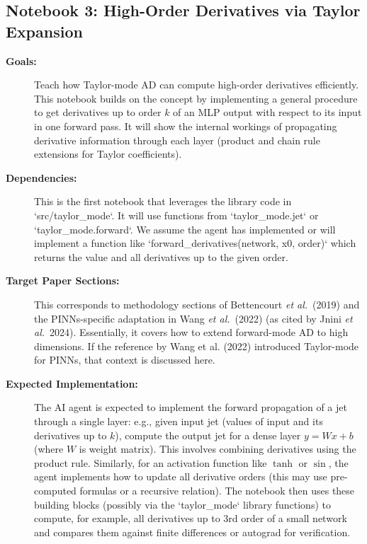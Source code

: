 \documentclass[11pt]{article}
\begin{document}
\subsection{Notebook 3: High-Order Derivatives via Taylor Expansion}
\begin{description}
  \item[\textbf{Goals:}] Teach how Taylor-mode AD can compute high-order derivatives efficiently. This notebook builds on the concept by implementing a general procedure to get derivatives up to order $k$ of an MLP output with respect to its input in one forward pass. It will show the internal workings of propagating derivative information through each layer (product and chain rule extensions for Taylor coefficients).
  \item[\textbf{Dependencies:}] This is the first notebook that leverages the library code in `src/taylor_mode`. It will use functions from `taylor_mode.jet` or `taylor_mode.forward`. We assume the agent has implemented or will implement a function like `forward_derivatives(network, x0, order)` which returns the value and all derivatives up to the given order.
  \item[\textbf{Target Paper Sections:}] This corresponds to methodology sections of Bettencourt \textit{et al.}\ (2019) and the PINNs-specific adaptation in Wang \textit{et al.}\ (2022) (as cited by Jnini \textit{et al.}\ 2024). Essentially, it covers how to extend forward-mode AD to high dimensions. If the reference by Wang et al. (2022) introduced Taylor-mode for PINNs, that context is discussed here.
  \item[\textbf{Expected Implementation:}] The AI agent is expected to implement the forward propagation of a jet through a single layer: e.g., given input jet (values of input and its derivatives up to $k$), compute the output jet for a dense layer $y = W x + b$ (where $W$ is weight matrix). This involves combining derivatives using the product rule. Similarly, for an activation function like $\tanh$ or $\sin$, the agent implements how to update all derivative orders (this may use pre-computed formulas or a recursive relation). The notebook then uses these building blocks (possibly via the `taylor_mode` library functions) to compute, for example, all derivatives up to 3rd order of a small network and compares them against finite differences or autograd for verification.
\end{description}
\end{document}
